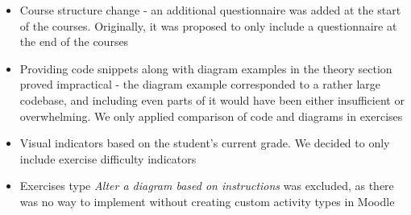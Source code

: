 \begin{itemize}
    \item Course structure change - an additional questionnaire was added at the start of the courses. Originally, it was proposed to only include a questionnaire at the end of the courses
    \item Providing code snippets along with diagram examples in the theory section proved impractical - the diagram example corresponded to a rather large codebase, and including even parts of it would have been either insufficient or overwhelming. We only applied comparison of code and diagrams in exercises
    \item Visual indicators based on the student's current grade. We decided to only include exercise difficulty indicators
    \item Exercises type \textit{Alter a diagram based on instructions} was excluded, as there was no way to implement without creating custom activity types in Moodle
\end{itemize}







